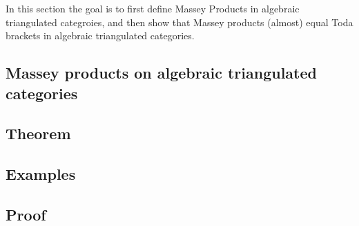In this section the goal is to first define Massey Products in algebraic triangulated categroies, and then show that Massey products (almost) equal Toda brackets in algebraic triangulated categories.

\subsection{Massey products on algebraic triangulated categories}


\subsection{Theorem}


\subsection{Examples}


\subsection{Proof}
